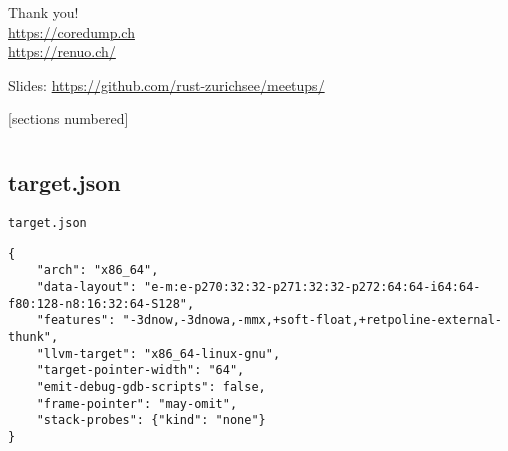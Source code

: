 \documentclass[aspectratio=1609,14pt,t]{beamer}
\begin{document}
{
\begin{frame}[standout]
  \begin{centering}
    {\Huge Thank you!}\\
    {\normalsize \url{https://coredump.ch}}\\
    {\normalsize \url{https://renuo.ch/}}\\
  \end{centering}
  {\small Slides: \url{https://github.com/rust-zurichsee/meetups/}}\\
  \vspace{3cm}
\end{frame}
}


[sections numbered]
\appendix
\section{\appendixname}
\frame{\tableofcontents}

\subsection{target.json}


\begin{frame}[c,fragile]{\texttt{target.json}}
  \begin{verbatim}
{
    "arch": "x86_64",
    "data-layout": "e-m:e-p270:32:32-p271:32:32-p272:64:64-i64:64-f80:128-n8:16:32:64-S128",
    "features": "-3dnow,-3dnowa,-mmx,+soft-float,+retpoline-external-thunk",
    "llvm-target": "x86_64-linux-gnu",
    "target-pointer-width": "64",
    "emit-debug-gdb-scripts": false,
    "frame-pointer": "may-omit",
    "stack-probes": {"kind": "none"}
}
  \end{verbatim}
\end{frame}
\end{document}
